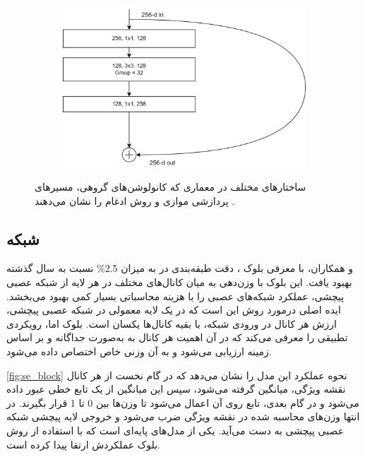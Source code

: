 \begin{figure}[h!]
\begin{subfigure}{0.33\textwidth}
        \includegraphics[width=\linewidth]{Images/Chapter2/resnext3.png}
        \caption{}
        \label{fig:ch2-resnext3}
    \end{subfigure}
    \caption{ساختارهای مختلف در معماری 
     که کانولوشن‌های گروهی، مسیرهای پردازشی موازی و روش ادغام را نشان می‌دهند
     \cite{xie2017aggregated}.}
    \label{fig:fig:ch2-resnext}
\end{figure}







\subsection{شبکه
}

\cite{hu2018squeeze}
و همکاران،‌ با معرفی بلوک
 ، دقت طبقه‌بندی در  به میزان 2.5\% نسبت به سال گذشته بهبود یافت. این بلوک با وزن‌دهی به میان کانال‌های مختلف در هر لایه از شبکه عصبی پیچشی، عملکرد شبکه‌های عصبی را با هزینه محاسباتی بسیار کمی بهبود می‌بخشد.
ایده اصلی درمورد روش 
  این است که در یک لایه معمولی در شبکه عصبی پیچشی، ارزش هر کانال در ورودی شبکه، با بقیه کانال‌ها یکسان است. بلوک  اما، رویکردی تطبیقی را معرفی می‌کند که در آن اهمیت هر کانال به به‌صورت جداگانه و بر اساس زمینه ارزیابی می‌شود و به آن وزنی خاص اختصاص داده می‌شود.

\autoref{fig:se_block}
نحوه عملکرد این مدل را نشان می‌دهد که در گام نخست از هر کانال نقشه ویژگی، میانگین گرفته می‌شود، سپس این میانگین از یک تابع خطی عبور داده می‌شود و در گام بعدی، تابع 
روی آن اعمال می‌شود تا وزن‌ها بین 0 تا 1 قرار بگیرند.
در انتها وزن‌های محاسبه شده در نقشه ویژگی ضرب می‌شود و خروجی لایه پیچشی 
 شبکه عصبی پیچشی به دست می‌آید.
 یکی از مدل‌های پایه‌ای است که با استفاده از روش بلوک
 عملکردش ارتقا پیدا کرده است.
 
